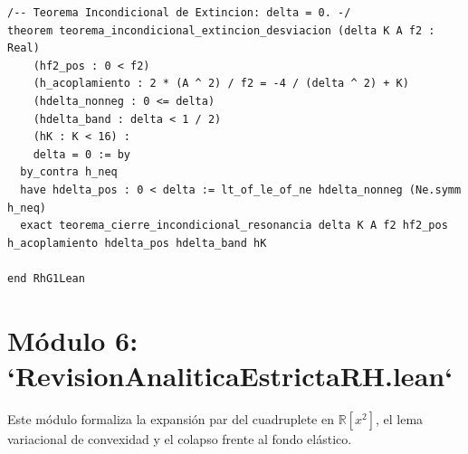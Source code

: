 \documentclass[11pt,a4paper]{article}
\theoremstyle{definition}
\theoremstyle{remark}
\begin{document}
\begin{lstlisting}[language=Lean4]
/-- Teorema Incondicional de Extincion: delta = 0. -/
theorem teorema_incondicional_extincion_desviacion (delta K A f2 : Real)
    (hf2_pos : 0 < f2)
    (h_acoplamiento : 2 * (A ^ 2) / f2 = -4 / (delta ^ 2) + K)
    (hdelta_nonneg : 0 <= delta)
    (hdelta_band : delta < 1 / 2)
    (hK : K < 16) :
    delta = 0 := by
  by_contra h_neq
  have hdelta_pos : 0 < delta := lt_of_le_of_ne hdelta_nonneg (Ne.symm h_neq)
  exact teorema_cierre_incondicional_resonancia delta K A f2 hf2_pos h_acoplamiento hdelta_pos hdelta_band hK

end RhG1Lean
\end{lstlisting}

\section{Módulo 6: `RevisionAnaliticaEstrictaRH.lean`}

Este módulo formaliza la expansión par del cuadruplete en $\mathbb{R}[x^2]$, el lema variacional de convexidad y el colapso frente al fondo elástico.
\end{document}
